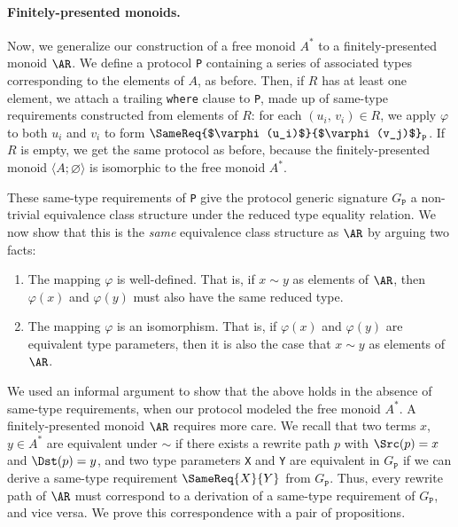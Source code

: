 \documentclass[../generics]{subfiles}
\begin{document}
\paragraph{Finitely-presented monoids.}
Now, we generalize our construction of a free monoid $A^*$ to a finitely-presented monoid $\AR$. We define a protocol \texttt{P} containing a series of associated types corresponding to the elements of $A$, as before. Then, if $R$ has at least one element, we attach a trailing \texttt{where} clause to \texttt{P}, made up of same-type requirements constructed from elements of $R$: for each $(u_i,\,v_i)\in R$, we apply $\varphi$ to both $u_i$ and $v_i$ to form $\SameReq{$\varphi(u_i)$}{$\varphi(v_j)$}_\texttt{P}$. If $R$ is empty, we get the same protocol as before, because the finitely-presented monoid $\langle A;\varnothing\rangle$ is isomorphic to the free monoid $A^*$.

These same-type requirements of \texttt{P} give the protocol generic signature $G_\texttt{P}$ a non-trivial equivalence class structure under the reduced type equality relation. We now show that this is the \emph{same} equivalence class structure as $\AR$ by arguing two facts:
\begin{enumerate}
\item The mapping $\varphi$ is well-defined. That is, if $x\sim y$ as elements of $\AR$, then $\varphi(x)$ and $\varphi(y)$ must also have the same reduced type.
\item The mapping $\varphi$ is an isomorphism. That is, if $\varphi(x)$ and $\varphi(y)$ are equivalent type parameters, then it is also the case that $x\sim y$ as elements of $\AR$.
\end{enumerate}
We used an informal argument to show that the above holds in the absence of same-type requirements, when our protocol modeled the free monoid $A^*$. A finitely-presented monoid $\AR$ requires more care. We recall that two terms $x$, $y\in A^*$ are equivalent under $\sim$ if there exists a rewrite path $p$ with $\Src(p)=x$ and $\Dst(p)=y$, and two type parameters \texttt{X} and \texttt{Y} are equivalent in $G_\texttt{P}$ if we can derive a same-type requirement $\SameReq{X}{Y}$ from $G_\texttt{P}$. Thus, every rewrite path of $\AR$ must correspond to a derivation of a same-type requirement of $G_\texttt{P}$, and vice versa. We prove this correspondence with a pair of propositions.
\end{document}
